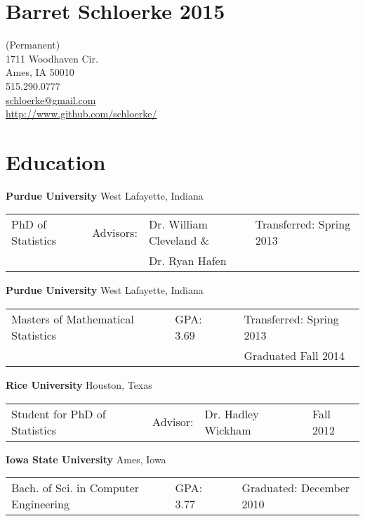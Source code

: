 \documentclass[oneside]{article}
\begin{document}
\section*{Barret Schloerke 2015 }

(Permanent)\\
1711 Woodhaven Cir.\\
Ames, IA 50010 \\
515.290.0777 \\
\href{mailto:schloerke@gmail.com}{schloerke@gmail.com} \\
\url{http://www.github.com/schloerke/}

\section{Education}

\textbf{Purdue University} West Lafayette, Indiana

\begin{tabular}{p{1.75in}p{0.5in}p{1.50in}p{1.75in}}
PhD of Statistics & Advisors: & Dr. William Cleveland \& & Transferred: Spring 2013 \\
                  &           & Dr. Ryan Hafen & \\
\end{tabular}

\vspace{0.5em}

\textbf{Purdue University} West Lafayette, Indiana

\begin{tabular}{p{2.75in}p{0.75in}p{0.25in}p{1.75in}}
Masters of Mathematical Statistics & GPA: 3.69 & & Transferred: Spring 2013 \\
& & & Graduated Fall 2014  \\
\end{tabular}

\vspace{0.5em}

\textbf{Rice University} Houston, Texas

\begin{tabular}{p{1.75in}p{0.5in}p{1.50in}p{1.75in}}
Student for PhD of Statistics & 
Advisor: & Dr. Hadley Wickham & 
Fall 2012
\end{tabular}

\vspace{0.5em}

\textbf{Iowa State University} Ames, Iowa

\begin{tabular}{p{2.75in}p{0.75in}p{0.25in}p{1.75in}}
Bach. of Sci. in Computer Engineering &
GPA: 3.77 & &
Graduated: December 2010
\end{tabular}
\end{document}
